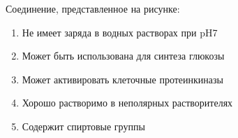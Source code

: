 
Соединение, представленное на рисунке:


\begin{enumerate}
    \item Не имеет заряда в водных растворах при pH7 
    \item Может быть использована для синтеза глюкозы
    \item Может активировать клеточные протеинкиназы
    \item Хорошо растворимо в неполярных растворителях
    \item Содержит спиртовые группы	
\end{enumerate}




